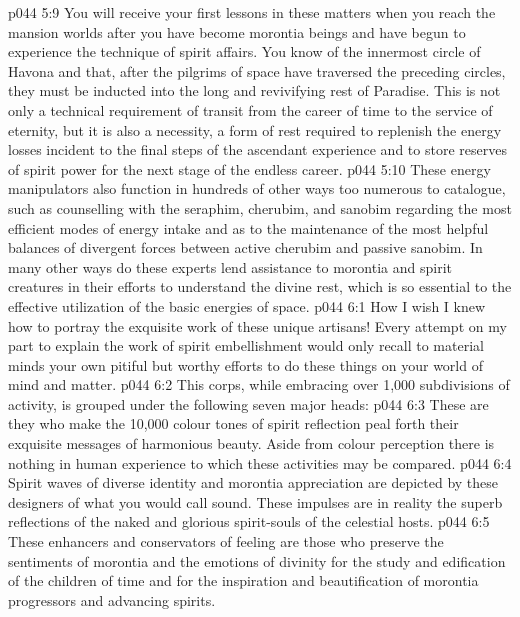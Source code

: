 \vs p044 5:9 You will receive your first lessons in these matters when you reach the mansion worlds after you have become morontia beings and have begun to experience the technique of spirit affairs. You know of the innermost circle of Havona and that, after the pilgrims of space have traversed the preceding circles, they must be inducted into the long and revivifying rest of Paradise. This is not only a technical requirement of transit from the career of time to the service of eternity, but it is also a necessity, a form of rest required to replenish the energy losses incident to the final steps of the ascendant experience and to store reserves of spirit power for the next stage of the endless career.
\vs p044 5:10 These energy manipulators also function in hundreds of other ways too numerous to catalogue, such as counselling with the seraphim, cherubim, and sanobim regarding the most efficient modes of energy intake and as to the maintenance of the most helpful balances of divergent forces between active cherubim and passive sanobim. In many other ways do these experts lend assistance to morontia and spirit creatures in their efforts to understand the divine rest, which is so essential to the effective utilization of the basic energies of space.
\vs p044 6:1 How I wish I knew how to portray the exquisite work of these unique artisans! Every attempt on my part to explain the work of spirit embellishment would only recall to material minds your own pitiful but worthy efforts to do these things on your world of mind and matter.
\vs p044 6:2 This corps, while embracing over 1,000 subdivisions of activity, is grouped under the following seven major heads:
\vs p044 6:3 \bibnobreakspace {} These are they who make the 10,000 colour tones of spirit reflection peal forth their exquisite messages of harmonious beauty. Aside from colour perception there is nothing in human experience to which these activities may be compared.
\vs p044 6:4 \bibnobreakspace {} Spirit waves of diverse identity and morontia appreciation are depicted by these designers of what you would call sound. These impulses are in reality the superb reflections of the naked and glorious spirit\hyp{}souls of the celestial hosts.
\vs p044 6:5 \bibnobreakspace {} These enhancers and conservators of feeling are those who preserve the sentiments of morontia and the emotions of divinity for the study and edification of the children of time and for the inspiration and beautification of morontia progressors and advancing spirits.
